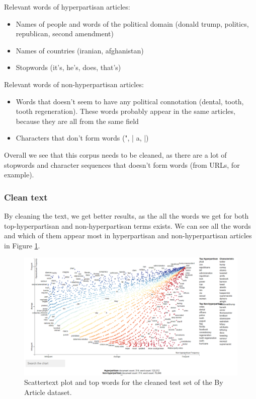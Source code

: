 \documentclass[11pt,a4paper]{article}
\begin{document}
Relevant words of hyperpartisan articles:

\begin{itemize}
    \item Names of people and words of the political domain (donald trump, politics, republican, second amendment)
    \item Names of countries (iranian, afghanistan)
    \item Stopwords (it's, he's, does, that's)
\end{itemize}

Relevant words of non-hyperpartisan articles:

\begin{itemize}
    \item Words that doesn't seem to have any political connotation (dental, tooth, tooth regeneration). These words probably appear in the same articles, because they are all from the same field
    \item Characters that don't form words (", | a, |)
\end{itemize}

Overall we see that this corpus needs to be cleaned, as there are a lot of stopwords and character sequences that doesn't form words (from URLs, for example). 

\subsubsection{Clean text}
By cleaning the text, we get better results, as the all the words we get for both top-hyperpartisan and non-hyperpartisan terms exists. We can see all the words and which of them appear most in hyperpartisan and non-hyperpartisan articles in Figure \ref{fig:byarticle_test_clean}.
 
\begin{figure}[ht]
    \centering
    \includegraphics[width=\linewidth]{byarticle_test_clean.png}
    \caption{Scattertext plot and top words for the cleaned test set of the By Article dataset.}
    \label{fig:byarticle_test_clean}
\end{figure}
\end{document}
